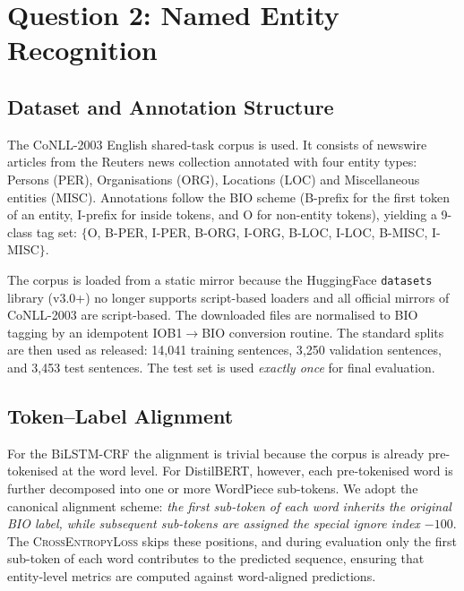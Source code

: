 
\section{Question 2: Named Entity Recognition}

\subsection{Dataset and Annotation Structure}

The CoNLL-2003 English shared-task corpus \cite{sang2003conll} is used. It
consists of newswire articles from the Reuters news collection annotated
with four entity types: Persons (\textsc{PER}), Organisations
(\textsc{ORG}), Locations (\textsc{LOC}) and Miscellaneous entities
(\textsc{MISC}). Annotations follow the BIO scheme (\textsc{B}-prefix
for the first token of an entity, \textsc{I}-prefix for inside tokens, and
\textsc{O} for non-entity tokens), yielding a 9-class tag set:
$\{$O, B-PER, I-PER, B-ORG, I-ORG, B-LOC, I-LOC, B-MISC, I-MISC$\}$.

The corpus is loaded from a static mirror because the HuggingFace
\texttt{datasets} library (v3.0+) no longer supports script-based
loaders and all official mirrors of CoNLL-2003 are script-based. The
downloaded files are normalised to BIO tagging by an idempotent
IOB1$\rightarrow$BIO conversion routine. The standard splits are then
used as released: 14{,}041 training sentences, 3{,}250 validation
sentences, and 3{,}453 test sentences. The test set is used
\emph{exactly once} for final evaluation.

\subsection{Token--Label Alignment}

For the BiLSTM-CRF the alignment is trivial because the corpus is already
pre-tokenised at the word level. For DistilBERT, however, each
pre-tokenised word is further decomposed into one or more WordPiece
sub-tokens. We adopt the canonical alignment scheme: \emph{the first
sub-token of each word inherits the original BIO label, while subsequent
sub-tokens are assigned the special ignore index $-100$}. The
\textsc{CrossEntropyLoss} skips these positions, and during evaluation
only the first sub-token of each word contributes to the predicted
sequence, ensuring that entity-level metrics are computed against
word-aligned predictions.

